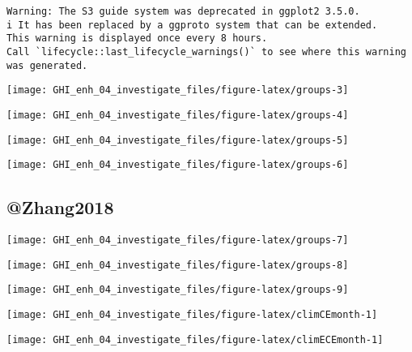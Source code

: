 \documentclass[
  10pt,
  a4paper,oneside]{article}
\begin{document}
\begin{verbatim}
Warning: The S3 guide system was deprecated in ggplot2 3.5.0.
i It has been replaced by a ggproto system that can be extended.
This warning is displayed once every 8 hours.
Call `lifecycle::last_lifecycle_warnings()` to see where this warning was generated.
\end{verbatim}

\begin{center}\texttt{[image: GHI\_enh\_04\_investigate\_files/figure-latex/groups-3]} \end{center}

\begin{center}\texttt{[image: GHI\_enh\_04\_investigate\_files/figure-latex/groups-4]} \end{center}

\begin{center}\texttt{[image: GHI\_enh\_04\_investigate\_files/figure-latex/groups-5]} \end{center}

\begin{center}\texttt{[image: GHI\_enh\_04\_investigate\_files/figure-latex/groups-6]} \end{center}

\hypertarget{zhang2018}{%
\subsection{@Zhang2018}\label{zhang2018}}

\begin{center}\texttt{[image: GHI\_enh\_04\_investigate\_files/figure-latex/groups-7]} \end{center}

\begin{center}\texttt{[image: GHI\_enh\_04\_investigate\_files/figure-latex/groups-8]} \end{center}

\begin{center}\texttt{[image: GHI\_enh\_04\_investigate\_files/figure-latex/groups-9]} \end{center}

\begin{center}\texttt{[image: GHI\_enh\_04\_investigate\_files/figure-latex/climCEmonth-1]} \end{center}

\begin{center}\texttt{[image: GHI\_enh\_04\_investigate\_files/figure-latex/climECEmonth-1]} \end{center}
\end{document}
